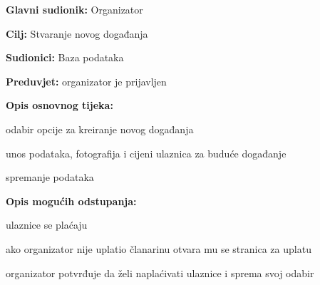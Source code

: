 					\noindent {}
					\begin{packed_item}
	
						\item \textbf{Glavni sudionik: }Organizator 
						\item  \textbf{Cilj:} Stvaranje novog događanja
						\item  \textbf{Sudionici:} Baza podataka
						\item  \textbf{Preduvjet:} organizator je prijavljen
						\item  \textbf{Opis osnovnog tijeka:}
						
						\item[] \begin{packed_enum}
	
							\item odabir opcije za kreiranje novog događanja
							\item unos podataka, fotografija i cijeni ulaznica za buduće događanje
							\item spremanje podataka
						\end{packed_enum}
						
						\item  \textbf{Opis mogućih odstupanja:}
						
						\item[] \begin{packed_item}
	
							\item[2.a] ulaznice se plaćaju
							\item[] \begin{packed_enum}
								
								\item ako organizator nije uplatio članarinu otvara mu se stranica za uplatu
								\item organizator potvrđuje da želi naplaćivati ulaznice i sprema svoj odabir
								
							\end{packed_enum}
							
							
						\end{packed_item}
					\end{packed_item}
					

